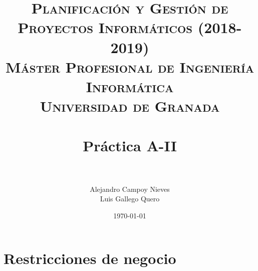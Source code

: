 

\title{	
	\normalfont \normalsize 
	\textsc{\textbf{Planificación y Gestión de Proyectos Informáticos (2018-2019)} \\ Máster Profesional de Ingeniería Informática \\ Universidad de Granada} \\ [25pt] %
	\horrule{0.5pt} \\[0.4cm] %
	\huge Práctica A-II \\ %
	\horrule{2pt} \\[0.5cm] %
}

\author{Alejandro Campoy Nieves \\ Luis Gallego Quero} %
\date{\normalsize\today} %

\usepackage[spanish, es-tabla]{babel}
\usepackage{hyperref} %
\hypersetup{
	colorlinks=true,
	linkcolor=blue,
	filecolor=magenta,      
	urlcolor=cyan,
}
\usepackage{graphicx}
\usepackage{amssymb, amsmath, amsbsy}
\usepackage{mathptmx}	
\usepackage{float}
\usepackage{booktabs}					%
\usepackage{eurosym}
\usepackage{xcolor}
\usepackage{colortbl}




	\maketitle %
	
	\newpage %
	
	\tableofcontents %
	
	\listoffigures
	
	\listoftables	
	
	\newpage	
 
\section{Restricciones de negocio}


